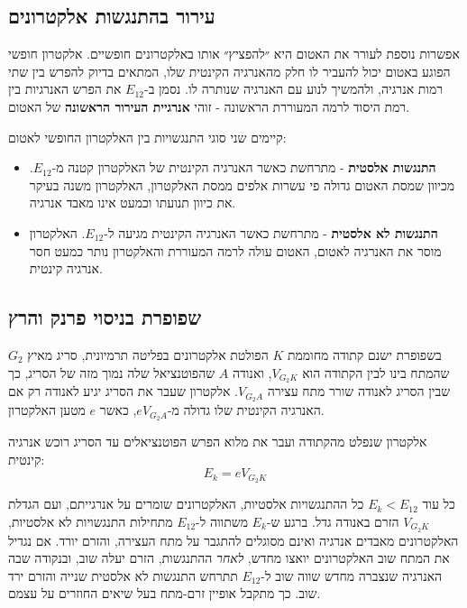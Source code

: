 \documentclass[14pt]{extarticle}
\begin{document}
\subsection*{עירור בהתנגשות אלקטרונים}

אפשרות נוספת לעורר את האטום היא ״להפציץ״ אותו באלקטרונים חופשיים. אלקטרון חופשי הפוגע
באטום יכול להעביר לו חלק מהאנרגיה הקינטית שלו, המתאים בדיוק להפרש בין שתי רמות אנרגיה, ולהמשיך
לנוע עם האנרגיה שנותרה לו. נסמן ב-$E_{12}$ את הפרש האנרגיות בין רמת היסוד לרמה המעוררת
הראשונה - זוהי \textbf{אנרגיית העירור הראשונה} של האטום.

קיימים שני סוגי התנגשויות בין האלקטרון החופשי לאטום:
\begin{itemize}
    \item \textbf{התנגשות אלסטית} - מתרחשת כאשר האנרגיה הקינטית של האלקטרון קטנה מ-$E_{12}$.
    מכיוון שמסת האטום גדולה פי עשרות אלפים ממסת האלקטרון, האלקטרון משנה בעיקר את כיוון תנועתו
    וכמעט אינו מאבד אנרגיה.
    \item \textbf{התנגשות לא אלסטית} - מתרחשת כאשר האנרגיה הקינטית מגיעה ל-$E_{12}$. האלקטרון
    מוסר את האנרגיה לאטום, האטום עולה לרמה המעוררת והאלקטרון נותר כמעט חסר אנרגיה קינטית.
\end{itemize}

\subsection*{שפופרת בניסוי פרנק והרץ}

בשפופרת ישנם קתודה מחוממת $K$ הפולטת אלקטרונים בפליטה תרמיונית, סריג מאיץ $G_2$ שהמתח בינו לבין
הקתודה הוא $V_{G_2K}$, ואנודה $A$ שהפוטנציאל שלה נמוך מזה של הסריג, כך שבין הסריג לאנודה שורר
מתח עצירה $V_{G_2A}$. אלקטרון שעבר את הסריג יגיע לאנודה רק אם האנרגיה הקינטית שלו גדולה
מ-$eV_{G_2A}$, כאשר $e$ מטען האלקטרון.

אלקטרון שנפלט מהקתודה ועבר את מלוא הפרש הפוטנציאלים עד הסריג רוכש אנרגיה קינטית:
\begin{equation}
    E_k = e V_{G_2K}
\end{equation}

כל עוד $E_k < E_{12}$ כל ההתנגשויות אלסטיות, האלקטרונים שומרים על אנרגייתם, ועם הגדלת
$V_{G_2K}$ הזרם באנודה גדל. ברגע ש-$E_k$ משתווה ל-$E_{12}$ מתחילות התנגשויות לא אלסטיות,
האלקטרונים מאבדים אנרגיה ואינם מסוגלים להתגבר על מתח העצירה, והזרם יורד. אם נגדיל את המתח שוב
האלקטרונים יואצו מחדש, \emph{לאחר} ההתנגשות, הזרם יעלה שוב, ובנקודה שבה האנרגיה
שנצברה מחדש שווה שוב ל-$E_{12}$ תתרחש התנגשות לא אלסטית שנייה והזרם ירד שוב. כך מתקבל אופיין
זרם-מתח בעל שיאים החוזרים על עצמם.
\end{document}
